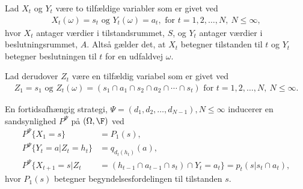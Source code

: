 Lad $X_t$ og $Y_t$ være to tilfældige variabler som er givet ved
\begin{align*}
    X_t(\omega) = s_t \text{ og } Y_t(\omega) = a_t, \text{ for } t=1,2,\dots, N, \  N\leq \infty,
\end{align*}
hvor $X_t$ antager værdier i tilstandsrummet, $S$, og $Y_t$ antager værdier i beslutningsrummet, $A$. Altså gælder det, at $X_t$ betegner tilstanden til $t$ og $Y_t$ betegner beslutningen til $t$ for en udfaldvej $\omega$.

Lad derudover $Z_t$ være en tilfældig variabel som er givet ved
\begin{align*}
    Z_1 = s_1 \text{ og } Z_t(\omega) = (s_1 \cap a_1 \cap s_2 \cap a_2 \cap \cdots \cap s_t) \text{ for } t=1,2,\dots, N, \  N\leq \infty.
\end{align*}

En fortidsafhængig strategi, $\Psi = (d_1, d_2, \dots, d_{N-1}), N \leq \infty$ inducerer en sandsynlighed $P^\Psi$ på $(\Omega, \F)$ ved
\begin{align}
    P^{\Psi}\{X_1=s\}&=P_1(s)\label{eqs:de_tre_ligninger},\\
    P^{\Psi}\{Y_t=a|Z_t=h_t\}&=q_{d_t(h_t)}(a)\label{eqs:de_tre_ligninger2},\\
    P^{\Psi}\{X_{t+1}=s|Z_t&=(h_{t-1}\cap a_{t-1}\cap s_t)\cap Y_t=a_t\}=p_t(s|s_t\cap a_t), \label{eqs:de_tre_ligninger3}
\end{align}
hvor $P_1(s)$ betegner begyndelsesfordelingen til tilstanden $s$.


